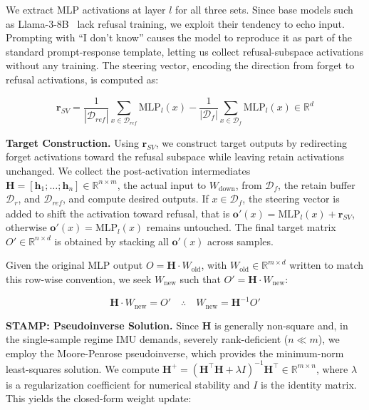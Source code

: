 We extract MLP activations at layer $l$ for all three sets. Since base models such as Llama-3-8B~\citeauthor{grattafiori2024llama} lack refusal training, we exploit their tendency to echo input. Prompting with ``I don't know'' causes the model to reproduce it as part of the standard prompt-response template, letting us collect refusal-subspace activations without any training. The steering vector, encoding the direction from forget to refusal activations, is computed as:

\begin{equation}
\mathbf{r}_{\textit{SV}} = \frac{1}{|\mathcal{D}_{\textit{ref}}|} \sum_{x \in \mathcal{D}_{\textit{ref}}} \text{MLP}_l(x) - \frac{1}{|\mathcal{D}_f|} \sum_{x \in \mathcal{D}_f} \text{MLP}_l(x) \in \mathbb{R}^d
\label{eq:steering_vector}
\end{equation}

\medskip
\noindent
\textbf{Target Construction.} Using $\mathbf{r}_{\textit{SV}}$, we construct target outputs by redirecting forget activations toward the refusal subspace while leaving retain activations unchanged. We collect the post-activation intermediates $\mathbf{H} = [\mathbf{h}_1; \ldots; \mathbf{h}_n] \in \mathbb{R}^{n \times m}$, the actual input to $W_{\text{down}}$, from $\mathcal{D}_f$, the retain buffer $\mathcal{D}_r$, and $\mathcal{D}_{\textit{ref}}$, and compute desired outputs. If $x \in \mathcal{D}_f$, the steering vector is added to shift the activation toward refusal, that is $\mathbf{o}'(x) = \text{MLP}_l(x) + \mathbf{r}_{\textit{SV}}$, otherwise $\mathbf{o}'(x) = \text{MLP}_l(x)$ remains untouched. The final target matrix $O' \in \mathbb{R}^{n \times d}$ is obtained by stacking all $\mathbf{o}'(x)$ across samples.

Given the original MLP output $O = \mathbf{H} \cdot W_{\text{old}}$, with $W_{\text{old}} \in \mathbb{R}^{m \times d}$ written to match this row-wise convention, we seek $W_{\text{new}}$ such that $O' = \mathbf{H} \cdot W_{\text{new}}$:

\begin{equation}
\mathbf{H} \cdot W_{\text{new}} = O' \quad \therefore \quad W_{\text{new}} = \mathbf{H}^{-1} O'
\label{eq:naive_inverse}
\end{equation}

\medskip
\noindent
\textbf{STAMP: Pseudoinverse Solution.} Since $\mathbf{H}$ is generally non-square and, in the single-sample regime IMU demands, severely rank-deficient ($n \ll m$), we employ the Moore-Penrose pseudoinverse, which provides the minimum-norm least-squares solution. We compute $\mathbf{H}^+ = (\mathbf{H}^\top \mathbf{H} + \lambda I)^{-1} \mathbf{H}^\top \in \mathbb{R}^{m \times n}$, where $\lambda$ is a regularization coefficient for numerical stability and $I$ is the identity matrix. This yields the closed-form weight update:

